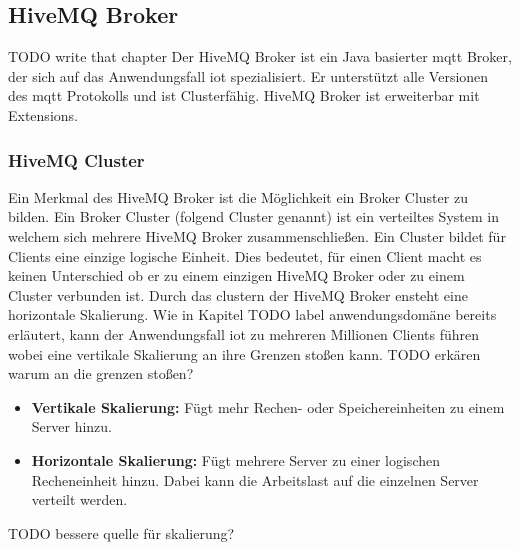 \newpage

\subsection{HiveMQ Broker}
TODO write that chapter
Der HiveMQ Broker ist ein Java basierter \ac{mqtt} Broker, der sich auf das Anwendungsfall \acl{iot} spezialisiert.
Er unterstützt alle Versionen des \ac{mqtt} Protokolls und ist Clusterfähig. 
HiveMQ Broker ist erweiterbar mit Extensions.

\subsubsection{HiveMQ Cluster}
Ein Merkmal des HiveMQ Broker ist die Möglichkeit ein Broker Cluster zu bilden.
Ein Broker Cluster (folgend Cluster genannt) ist ein verteiltes System in welchem sich mehrere HiveMQ Broker zusammenschlie{\ss}en.
Ein Cluster bildet für Clients eine einzige logische Einheit.
Dies bedeutet, für einen Client macht es keinen Unterschied ob er zu einem einzigen HiveMQ Broker oder zu einem Cluster verbunden ist.
\cite{HiveMQClusterHiveMQ}
Durch das clustern der HiveMQ Broker ensteht eine horizontale Skalierung. Wie in Kapitel TODO label anwendungsdomäne bereits erläutert, kann der Anwendungsfall \ac{iot} zu mehreren Millionen Clients führen wobei eine vertikale Skalierung an ihre Grenzen sto{\ss}en kann.
TODO erkären warum an die grenzen sto{\ss}en?
\begin{itemize}
    \item \textbf{Vertikale Skalierung:} Fügt mehr Rechen- oder Speichereinheiten zu einem Server hinzu.
    \item \textbf{Horizontale Skalierung:} Fügt mehrere Server zu einer logischen Recheneinheit hinzu. Dabei kann die Arbeitslast auf die einzelnen Server verteilt werden.
\end{itemize}
TODO bessere quelle für skalierung?
\cite{HowScaleIT}

